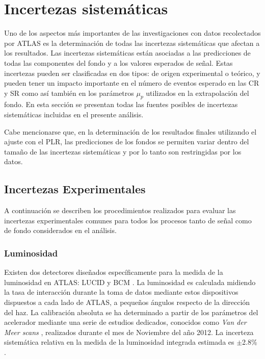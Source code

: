 \section{Incertezas sistemáticas}
\label{sec:sistematicos}

Uno de los aspectos más importantes de las investigaciones con datos recolectados
por ATLAS es la determinación de todas las incertezas sistemáticas que afectan a
los resultados. Las incertezas sistemáticas están asociadas a las predicciones
de todas las componentes del fondo y a los valores esperados de señal. Estas
incertezas pueden ser clasificadas en dos tipos: de origen experimental o
teórico, y pueden tener un impacto importante en el número de eventos esperado
en las CR y SR como así también en los parámetros $\mu_p$ utilizados en la
extrapolación del fondo. En esta sección se presentan todas las fuentes
posibles de incertezas sistemáticas incluidas en el presente análisis.

Cabe mencionarse que, en la determinación de los resultados finales utilizando
el ajuste con el PLR, las predicciones de los fondos se permiten variar dentro
del tamaño de las incertezas sistemáticas y por lo tanto son restringidas por
los datos.


\subsection{Incertezas Experimentales}\label{sec:expsyst}

A continuación se describen los procedimientos realizados para evaluar las
incertezas experimentales comunes para todos los procesos tanto de señal como de
fondo considerados en el análisis.


\subsubsection{Luminosidad}

Existen dos detectores dise\~nados específicamente para la medida de la
luminosidad en ATLAS: LUCID y BCM \cite{lumi2011}. La luminosidad es calculada
midiendo la tasa de interacción durante la toma de datos mediante estos
dispositivos dispuestos a cada lado de ATLAS, a pequeños ángulos respecto de la
dirección del haz. La calibración absoluta se ha determinado a partir de los
parámetros del acelerador mediante una serie de estudios dedicados, conocidos
como \emph{Van der Meer scans} \cite{vanderMeer:296752}, realizados durante el
mes de Noviembre del a\~no 2012. La incerteza sistemática relativa en la medida
de la luminosidad integrada estimada es $\pm$2.8\% \cite{lumi2012}.

